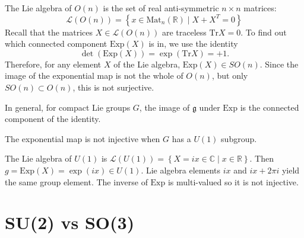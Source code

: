 \begin{example}[$G= O(n)$]
  The Lie algebra of $O(n)$ is the set of real anti-symmetric $n \times n$ matrices:
  \begin{equation}
    \mathscr{L}(O(n)) = \left\{ x \in \text{Mat}_n(\mathbb{R}) \mid X + X^T = 0 \right\}
  \end{equation}
  Recall that the matrices $X \in \mathscr{L}(O(n))$ are traceless $\text{Tr} X = 0$.
  To find out which connected component $\text{Exp}(X)$ is in, we use the identity
  \begin{equation}
    \det(\text{Exp}(X)) = \exp(\text{Tr}X) = +1.
  \end{equation}
  Therefore, for any element $X$ of the Lie algebra, $\text{Exp}(X) \in SO(n)$. Since the image of the exponential map is not the whole of $O(n)$, but only $SO(n) \subset O(n)$, this is not surjective.
\end{example}
\begin{claim}
  In general, for compact Lie groups $G$, the image of $\mathfrak{g}$ under $\text{Exp}$ is the connected component of the identity.
\end{claim}
\begin{claim}
  The exponential map is not injective when $G$ has a $U(1)$ subgroup.
\end{claim}
\begin{example}[$G = U(1)$]
  The Lie algebra of $U(1)$ is $\mathscr{L}(U(1)) = \left\{ X = ix \in \mathbb{C} \mid x \in \mathbb{R} \right\}$. Then $g = \text{Exp}(X) = \exp(ix) \in U(1)$. Lie algebra elements $ix$ and $ix + 2 \pi i$ yield the same group element.
  The inverse of $\text{Exp}$ is multi-valued so it is not injective.
\end{example}

\section{SU(2) vs SO(3)}%
\label{sec:su_2_vs_so_3_}

